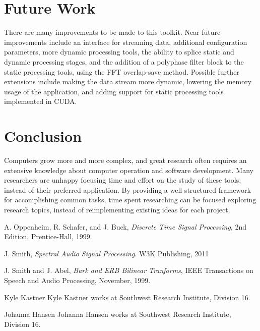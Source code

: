 \documentclass[journal]{IEEEtran}
\begin{document}
\section{Future Work}
There are many improvements to be made to this toolkit. Near future improvements include an interface for streaming data, additional configuration
parameters, more dynamic processing tools, the ability to splice static and dynamic processing stages, and the addition of a polyphase filter block
to the static processing tools, using the FFT overlap-save method. Possible further extensions include making the data stream more dynamic, 
lowering the memory usage of the application, and adding support for static processing tools implemented in CUDA.

\section{Conclusion}
Computers grow more and more complex, and great research often requires an extensive knowledge about computer operation and software development. Many researchers are unhappy focusing time and effort on the study of these tools, instead of their preferred
application. By providing a well-structured framework for accomplishing common tasks, time spent researching can be focused exploring research 
topics, instead of reimplementing existing ideas for each project.

\begin{thebibliography}{1}
A. Oppenheim, R. Schafer, and J. Buck, \emph{Discrete Time Signal Processing}, 2nd Edition. Prentice-Hall, 1999.

J. Smith, \emph{Spectral Audio Signal Processing}. W3K Publishing, 2011

J. Smith and J. Abel, \emph{Bark and ERB Bilinear Tranforms}, IEEE Transactions on Speech and Audio Processing, November, 1999.
\end{thebibliography}

\begin{IEEEbiographynophoto}{Kyle Kastner}
Kyle Kastner works at Southwest Research Institute, Division 16.
\end{IEEEbiographynophoto}

\begin{IEEEbiographynophoto}{Johanna Hansen}
Johanna Hansen works at Southwest Research Institute, Division 16.
\end{IEEEbiographynophoto}




\end{document}
